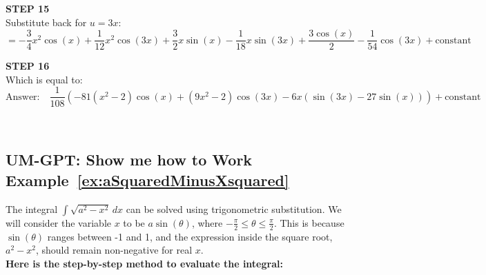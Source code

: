 \textbf{STEP 15} \\
Substitute back for \( u = 3 x \):
\[ = -\frac{3}{4} x^2 \cos(x) + \frac{1}{12} x^2 \cos(3 x) + \frac{3}{2} x \sin(x) - \frac{1}{18} x \sin(3 x) + \frac{3 \cos(x)}{2} - \frac{1}{54} \cos(3 x) + \text{constant} \]

\textbf{STEP 16} \\
Which is equal to:
\[ \text{Answer:} \quad \frac{1}{108} (-81 (x^2 - 2) \cos(x) + (9 x^2 - 2) \cos(3 x) - 6 x (\sin(3 x) - 27 \sin(x))) + \text{constant} \]

\



\subsection{UM-GPT: Show me how to Work Example~\ref{ex:aSquaredMinusXsquared} }

The integral $\int \sqrt{a^2 - x^2} \, dx$ can be solved using trigonometric substitution. We will consider the variable $x$ to be $a \sin(\theta)$, where $-\frac{\pi}{2} \leq \theta \leq \frac{\pi}{2}$. This is because $\sin(\theta)$ ranges between -1 and 1, and the expression inside the square root, $a^2 - x^2$, should remain non-negative for real $x$.\\

\textbf{Here is the step-by-step method to evaluate the integral:}

